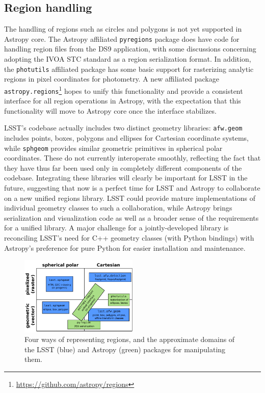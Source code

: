 \documentclass[]{spie}  %
\begin{document}
\subsection{Region handling}

The handling of regions such as circles and polygons is not yet supported in Astropy core.
The Astropy affiliated \texttt{pyregions} package does have code for handling region files from the DS9 application\cite{2005ASPC..347..110J}, with some discussions concerning adopting the IVOA STC standard\cite{2007ivoa.spec.1030R} as a region serialization format.
In addition, the \texttt{photutils} affiliated package has some basic support for rasterizing analytic regions in pixel coordinates for photometry.
A new affiliated package \texttt{astropy.regions}\footnote{\url{https://github.com/astropy/regions}} hopes to unify this functionality and provide a consistent interface for all region operations in Astropy, with the expectation that this functionality will move to Astropy core once the interface stabilizes.

LSST's codebase actually includes two distinct geometry libraries:
\texttt{afw.geom} includes points, boxes, polygons and ellipses for Cartesian coordinate systems, while \texttt{sphgeom} provides similar geometric primitives in spherical polar coordinates.
These do not currently interoperate smoothly, reflecting the fact that they have thus far been used only in completely different components of the codebase.
Integrating these libraries will clearly be important for LSST in the future, suggesting that now is a perfect time for LSST and Astropy to collaborate on a new unified regions library.
LSST could provide mature implementations of individual geometry classes to such a collaboration, while Astropy brings serialization and visualization code as well as a broader sense of the requirements for a unified library.
A major challenge for a jointly-developed library is reconciling LSST's need for C++ geometry classes (with Python bindings) with Astropy's preference for pure Python for easier installation and maintenance.

\begin{figure}[t]
\begin{center}
\includegraphics[width=0.5\textwidth]{regions}
\end{center}
\caption{Four ways of representing regions, and the approximate domains of the LSST (blue) and Astropy (green) packages for manipulating them.}
\label{fig:regions}
\end{figure}
\end{document}
